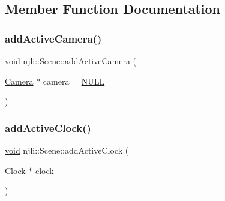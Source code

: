 \subsection{Member Function Documentation}
\mbox{\label{classnjli_1_1_scene_a8dadc66e35d70f7d51bceee337aa268d}} 
\subsubsection{\texorpdfstring{add\+Active\+Camera()}{addActiveCamera()}}
{\footnotesize\ttfamily \mbox{\hyperlink{_thread_8h_af1e856da2e658414cb2456cb6f7ebc66}{void}} njli\+::\+Scene\+::add\+Active\+Camera (\begin{DoxyParamCaption}\item[{\mbox{\hyperlink{classnjli_1_1_camera}{Camera}} $\ast$}]{camera = {\ttfamily \mbox{\hyperlink{_util_8h_a070d2ce7b6bb7e5c05602aa8c308d0c4}{N\+U\+LL}}} }\end{DoxyParamCaption})\hspace{0.3cm}{\ttfamily [protected]}}

\mbox{\label{classnjli_1_1_scene_a8ccfdf570bddfeda002ab780f14223a0}} 
\subsubsection{\texorpdfstring{add\+Active\+Clock()}{addActiveClock()}}
{\footnotesize\ttfamily \mbox{\hyperlink{_thread_8h_af1e856da2e658414cb2456cb6f7ebc66}{void}} njli\+::\+Scene\+::add\+Active\+Clock (\begin{DoxyParamCaption}\item[{\mbox{\hyperlink{classnjli_1_1_clock}{Clock}} $\ast$}]{clock }\end{DoxyParamCaption})\hspace{0.3cm}{\ttfamily [protected]}}

\mbox{\label{classnjli_1_1_scene_aadb34e2132fede8f4a3dc0a9fdbb9d2c}} 
